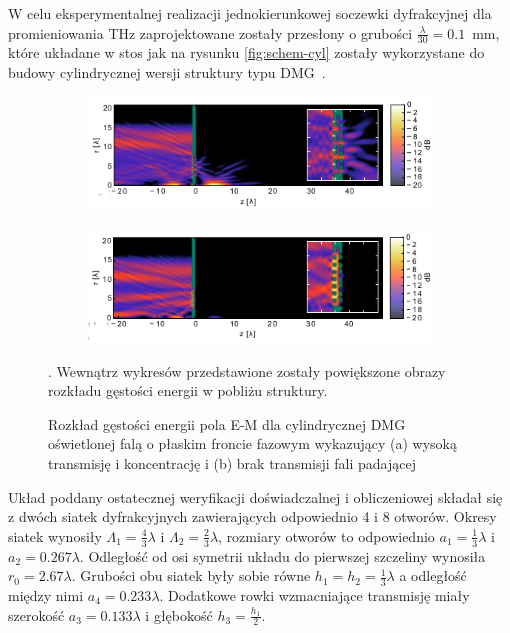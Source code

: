 W celu eksperymentalnej realizacji jednokierunkowej soczewki dyfrakcyjnej dla promieniowania THz zaprojektowane zostały przesłony o grubości $\frac{\lambda}{30}=0.1$~mm, które układane w stos jak na rysunku \ref{fig:schem-cyl} zostały wykorzystane do budowy cylindrycznej wersji struktury typu DMG~\cite{Yavorskiy:14}. 
\begin{figure}
	\begin{subfigure}{\textwidth}
		\includegraphics[width=\textwidth]{images/dmg/express-high-kontrast-trans.png}
		\caption{}
	\end{subfigure}

	\begin{subfigure}{\textwidth}
		\includegraphics[width=\textwidth]{images/dmg/express-high-kontrast-block.png}
		\caption{}
	\end{subfigure}
	\caption{Rozkład gęstości energii pola E-M dla cylindrycznej DMG oświetlonej falą o płaskim froncie fazowym wykazujący (a) wysoką transmisję i koncentrację i (b) brak transmisji fali padającej~\cite{Yavorskiy:14}}. Wewnątrz wykresów przedstawione zostały powiększone obrazy rozkładu gęstości energii w pobliżu struktury.
	\label{fig:cyl-gest-ene}
\end{figure}

Układ poddany ostatecznej weryfikacji doświadczalnej i obliczeniowej składał się z dwóch siatek dyfrakcyjnych zawierających odpowiednio 4 i 8 otworów. Okresy siatek wynosiły $\Lambda_1=\frac{4}{3} \lambda$ i $\Lambda_2=\frac{2}{3} \lambda$, rozmiary otworów to odpowiednio $a_1=\frac{1}{3}\lambda$ i $a_2=0.267 \lambda$. Odległość od osi symetrii układu do pierwszej szczeliny wynosiła $r_0=2.67\lambda$. Grubości obu siatek były sobie równe $h_1=h_2=\frac{1}{3}\lambda$ a odległość między nimi $a_4=0.233\lambda$. Dodatkowe rowki wzmacniające transmisję miały szerokość $a_3=0.133\lambda$ i głębokość $h_3=\frac{h_1}{2}$. 

